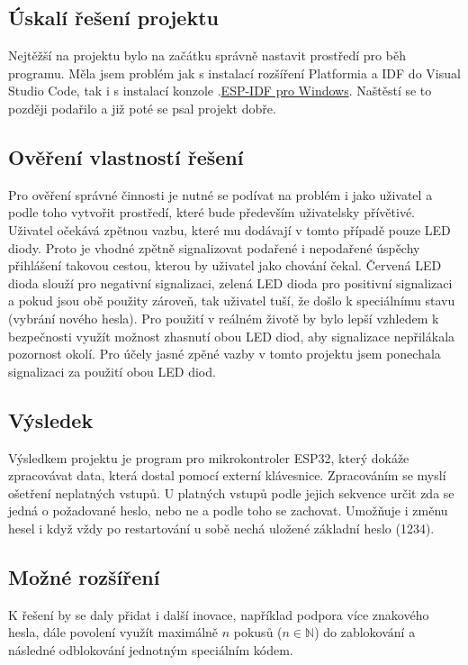 \documentclass[a4paper, 11pt]{article}
\begin{document}
\subsection{Úskalí řešení projektu}
Nejtěžší na projektu bylo na začátku správně nastavit prostředí pro běh programu. Měla jsem problém jak s instalací rozšíření Platformia a IDF do Visual Studio Code, tak i s instalací konzole .\href{https://dl.espressif.com/dl/esp-idf/}{ESP-IDF pro Windows}. Naštěstí se to později podařilo a již poté se psal projekt dobře. 

\subsection{Ověření vlastností řešení}
Pro ověření správné činnosti je nutné se podívat na problém i jako uživatel a podle toho vytvořit prostředí, které bude především uživatelsky přívětivé. Uživatel očekává zpětnou vazbu, které mu dodávají v tomto případě pouze LED diody. Proto je vhodné zpětně signalizovat podařené i nepodařené úspěchy přihlášení takovou cestou, kterou by uživatel jako chování čekal. Červená LED dioda slouží pro negativní signalizaci, zelená LED dioda pro positivní signalizaci a pokud jsou obě použity zároveň, tak uživatel tuší, že došlo k speciálnímu stavu (vybrání nového hesla). Pro použití v reálném životě by bylo lepší vzhledem k bezpečnosti využít možnost zhasnutí obou LED diod, aby signalizace nepřilákala pozornost okolí. Pro účely jasné zpěné vazby v tomto projektu jsem ponechala signalizaci za použití obou LED diod.

\subsection{Výsledek}
Výsledkem projektu je program pro mikrokontroler ESP32, který dokáže zpracovávat data, která dostal pomocí externí klávesnice. Zpracováním se myslí ošetření neplatných vstupů. U platných vstupů podle jejich sekvence určit zda se jedná o požadované heslo, nebo ne a podle toho se zachovat. Umožňuje i změnu hesel i když vždy po restartování u sobě nechá uložené základní heslo (1234).

\subsection{Možné rozšíření}
K řešení by se daly přidat i další inovace, například podpora více znakového hesla, dále povolení využít maximálně $n$ pokusů ($n \in \mathbb{N}$) do zablokování a následné odblokování jednotným speciálním kódem.

\newpage

\renewcommand{\refname}{Literatura}


\end{document}
